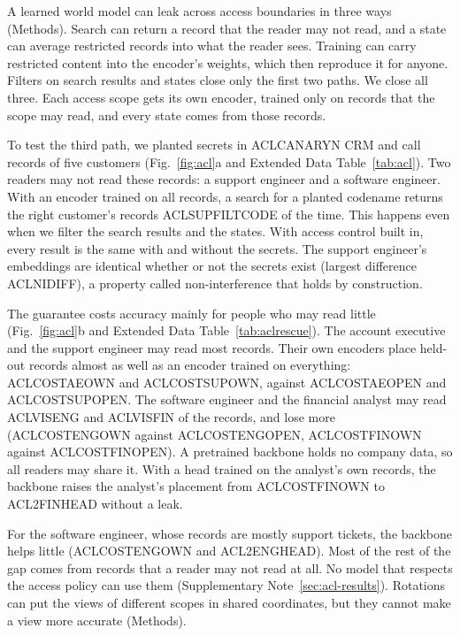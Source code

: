\documentclass[11pt]{article}
\begin{document}
A learned world model can leak across access boundaries in three ways (Methods). Search can return a record that the reader may not read, and a state can average restricted records into what the reader sees. Training can carry restricted content into the encoder's weights, which then reproduce it for anyone. Filters on search results and states close only the first two paths. We close all three. Each access scope gets its own encoder, trained only on records that the scope may read, and every state comes from those records.

To test the third path, we planted secrets in ACLCANARYN CRM and call records of five customers (Fig.~\ref{fig:acl}a and Extended Data Table~\ref{tab:acl}). Two readers may not read these records: a support engineer and a software engineer. With an encoder trained on all records, a search for a planted codename returns the right customer's records ACLSUPFILTCODE of the time. This happens even when we filter the search results and the states. With access control built in, every result is the same with and without the secrets. The support engineer's embeddings are identical whether or not the secrets exist (largest difference ACLNIDIFF), a property called non-interference that holds by construction\citep{tiwari2024ifc}.

The guarantee costs accuracy mainly for people who may read little (Fig.~\ref{fig:acl}b and Extended Data Table~\ref{tab:aclrescue}). The account executive and the support engineer may read most records. Their own encoders place held-out records almost as well as an encoder trained on everything: ACLCOSTAEOWN and ACLCOSTSUPOWN, against ACLCOSTAEOPEN and ACLCOSTSUPOPEN. The software engineer and the financial analyst may read ACLVISENG and ACLVISFIN of the records, and lose more (ACLCOSTENGOWN against ACLCOSTENGOPEN, ACLCOSTFINOWN against ACLCOSTFINOPEN). A pretrained backbone holds no company data, so all readers may share it. With a head trained on the analyst's own records, the backbone raises the analyst's placement from ACLCOSTFINOWN to ACL2FINHEAD without a leak.

For the software engineer, whose records are mostly support tickets, the backbone helps little (ACLCOSTENGOWN and ACL2ENGHEAD). Most of the rest of the gap comes from records that a reader may not read at all. No model that respects the access policy can use them (Supplementary Note~\ref{sec:acl-results}). Rotations can put the views of different scopes in shared coordinates, but they cannot make a view more accurate (Methods).
\end{document}
